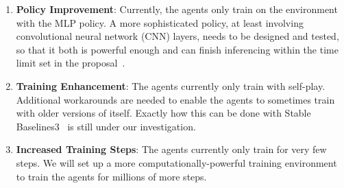 \documentclass[a4paper]{article}
\newcommand{\instruction}[1]{\textcolor{orange}{#1}}
\renewcommand{\instruction}[1]{} %
\begin{document}
\begin{enumerate}
    \item \textbf{Policy Improvement}: Currently,
    the agents only train on the environment with the MLP policy.
    A more sophisticated policy,
    at least involving convolutional neural network (CNN) layers,
    needs to be designed and tested,
    so that it both is powerful enough and can finish inferencing within the
    time limit set in the proposal~\cite{proposal}.

    \item \textbf{Training Enhancement}:
    The agents currently only train with self-play.
    Additional workarounds are needed to enable the agents to sometimes train
    with older versions of itself.
    Exactly how this can be done with Stable Baselines3~\cite{raffin2024stable}
    is still under our investigation.

    \item \textbf{Increased Training Steps}:
    The agents currently only train for very few steps.
    We will set up a more computationally-powerful training environment to train
    the agents for millions of more steps.
\end{enumerate}

\instruction{Maximum 6 pages}

\printbibliography
\end{document}
